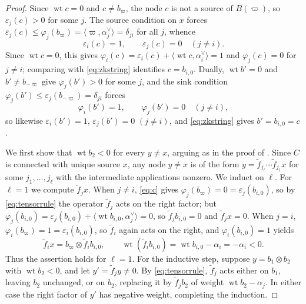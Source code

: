 \documentclass[12pt]{amsart}
\theoremstyle{plain}
\theoremstyle{remark}
\newcommand{\wt}{\operatorname{wt}}
\newcommand{\ot}{\otimes}
\newcommand{\vp}{\varpi}
\begin{document}
\begin{proof}
Since $\wt c=0$ and $c\neq b_\vp$, the node $c$ is not a source of $B(\vp)$, so
$\varepsilon_j(c)>0$ for some $j$. The source condition on $x$ forces
$\varepsilon_j(c)\le\varphi_j(b_\vp)=\langle\vp,\alpha_j^\vee\rangle=\delta_{ji}$ for all
$j$, whence
\begin{equation}\label{eq:c}
\varepsilon_i(c)=1,\qquad \varepsilon_j(c)=0\quad(j\neq i).
\end{equation}
Since $\wt c=0$, this gives $\varphi_i(c)=\varepsilon_i(c)+\langle\wt c,\alpha_i^\vee\rangle=1$
and $\varphi_j(c)=0$ for $j\neq i$; comparing with \eqref{eq:zkstring} identifies
$c=b_{i,0}$. Dually, $\wt b'=0$ and $b'\neq b_{-\vp}$ give
$\varphi_j(b')>0$ for some $j$, and the sink condition
$\varphi_j(b')\le\varepsilon_j(b_{-\vp})=\delta_{ji}$ forces
\begin{equation}\label{eq:b}
\varphi_i(b')=1,\qquad \varphi_j(b')=0\quad(j\neq i),
\end{equation}
so likewise $\varepsilon_i(b')=1$, $\varepsilon_j(b')=0$ $(j\neq i)$, and
\eqref{eq:zkstring} gives $b'=b_{i,0}=c$.

We first show that $\wt b_2<0$ for every $y\neq x$, arguing as in the proof of
\cite[Lemma~3.1]{Dey}. Since $C$ is connected with unique source $x$, any node
$y\neq x$ is of the form $y=\tilde f_{j_\ell}\cdots\tilde f_{j_1}x$ for some
$j_1,\dots,j_\ell$ with the intermediate applications nonzero. We induct on
$\ell$. For $\ell=1$ we compute $\tilde f_j x$. When $j\neq i$, \eqref{eq:c} gives
$\varphi_j(b_\vp)=0=\varepsilon_j(b_{i,0})$, so by \eqref{eq:tensorrule} the operator
$\tilde f_j$ acts on the right factor; but $\varphi_j(b_{i,0})=\varepsilon_j(b_{i,0})
+\langle\wt b_{i,0},\alpha_j^\vee\rangle=0$, so $\tilde f_j b_{i,0}=0$ and $\tilde f_j x=0$. When $j=i$,
$\varphi_i(b_\vp)=1=\varepsilon_i(b_{i,0})$, so $\tilde f_i$ again acts on the right, and
$\varphi_i(b_{i,0})=1$ yields
\[
\tilde f_i x=b_\vp\ot\tilde f_i b_{i,0},\qquad \wt(\tilde f_i b_{i,0})=\wt b_{i,0}-\alpha_i=-\alpha_i<0.
\]
Thus the assertion holds for $\ell=1$. For the inductive step, suppose $y=b_1\ot
b_2$ with $\wt b_2<0$, and let $y'=\tilde f_j y\neq0$. By \eqref{eq:tensorrule},
$\tilde f_j$ acts either on $b_1$, leaving $b_2$ unchanged, or on $b_2$, replacing
it by $\tilde f_j b_2$ of weight $\wt b_2-\alpha_j$. In either case the right
factor of $y'$ has negative weight, completing the induction.


\end{proof}
\end{document}
